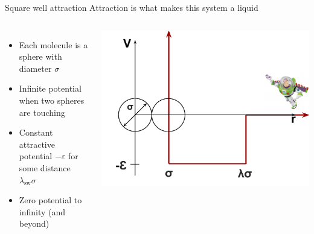 \documentclass[xcolor=dvipsnames]{beamer}
\newcommand{\lambdaSW}{\ensuremath{\lambda_\text{sw}}}
\begin{document}
\begin{frame}{Square well attraction}
  Attraction is what makes this system a liquid
  \begin{columns}
    \begin{itemize}
      \item Each molecule is a sphere with diameter $\sigma$
      \item Infinite potential when two spheres are touching
      \item Constant attractive potential $-\varepsilon$ for some distance $\lambdaSW\sigma$
      \item Zero potential to infinity (and beyond)
    \end{itemize}

    \begin{center}
      \includegraphics[width=\columnwidth]{figs/SW-schematic-buzz}
    \end{center}
  \end{columns}
\end{frame}
\end{document}

